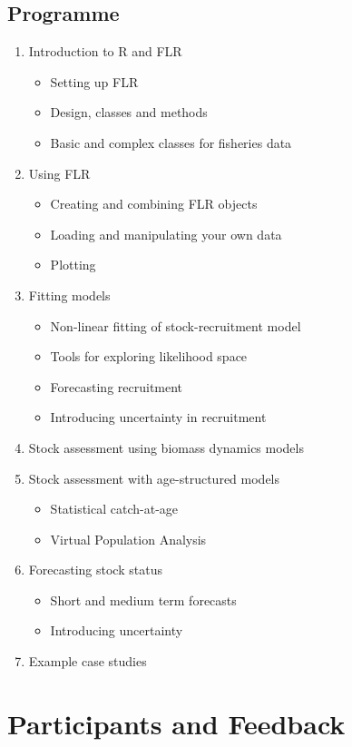 \documentclass[a4paper]{article}
\begin{document}
\subsection*{Programme}

\begin{enumerate}
	\item Introduction to R and FLR
	\begin{itemize}
		\item Setting up FLR
		\item Design, classes and methods
		\item Basic and complex classes for fisheries data
	\end{itemize}
	\item Using FLR	
	\begin{itemize}
		\item Creating and combining FLR objects
		\item Loading and manipulating your own data
		\item Plotting
	\end{itemize}
	\item Fitting models
	\begin{itemize}
		\item Non-linear fitting of stock-recruitment model
		\item Tools for exploring likelihood space
		\item Forecasting recruitment
		\item Introducing uncertainty in recruitment
	\end{itemize}
	\item Stock assessment using biomass dynamics models
	\item Stock assessment with age-structured models
	\begin{itemize}
		\item Statistical catch-at-age
		\item Virtual Population Analysis
	\end{itemize}
	\item Forecasting stock status
	\begin{itemize}
		\item Short and medium term forecasts
		\item Introducing uncertainty
	\end{itemize}
	\item Example case studies
\end{enumerate}

\section{Participants and Feedback}
\end{document}
